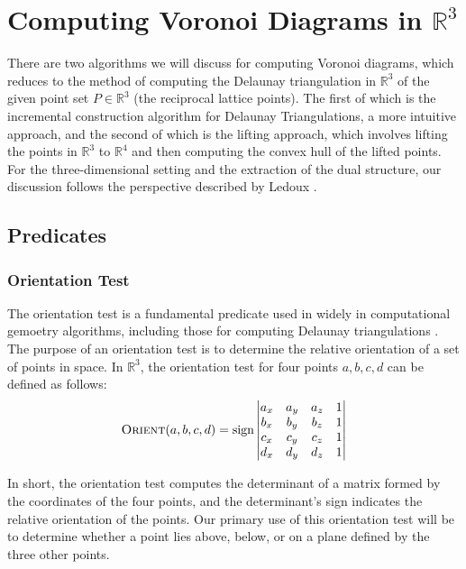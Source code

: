 \documentclass{article}
\begin{document}
\section{Computing Voronoi Diagrams in $\mathbb{R}^3$}
There are two algorithms we will discuss for computing Voronoi diagrams, which reduces to the method of computing the Delaunay triangulation in $\mathbb{R}^3$ of the given point set $P \in \mathbb{R}^3$ (the reciprocal lattice points). The first of which is the incremental construction algorithm for Delaunay Triangulations, a more intuitive approach, and the second of which is the lifting approach, which involves lifting the points in $\mathbb{R}^3$ to $\mathbb{R}^4$ and then computing the convex hull of the lifted points. For the three-dimensional setting and the extraction of the dual structure, our discussion follows the perspective described by Ledoux \cite{delaunay_to_voronoi}.

\subsection{Predicates}
\subsubsection{Orientation Test}
The orientation test is a fundamental predicate used in widely in computational gemoetry algorithms, including those for computing Delaunay triangulations \cite{lecture-notes-mount,lecture_notes_professor}. The purpose of an orientation test is to determine the relative orientation of a set of points in space. In $\mathbb{R}^3$, the orientation test for four points $a, b, c, d$ can be defined as follows:
\begin{equation}
    \textsc{Orient}(a, b, c, d) = \text{sign} \begin{vmatrix}
    a_x & a_y & a_z & 1 \\
    b_x & b_y & b_z & 1 \\
    c_x & c_y & c_z & 1 \\
    d_x & d_y & d_z & 1
    \end{vmatrix}
\end{equation}

In short, the orientation test computes the determinant of a matrix formed by the coordinates of the four points, and the determinant's sign indicates the relative orientation of the points. Our primary use of this orientation test will be to determine whether a point lies above, below, or on a plane defined by the three other points.
\end{document}
